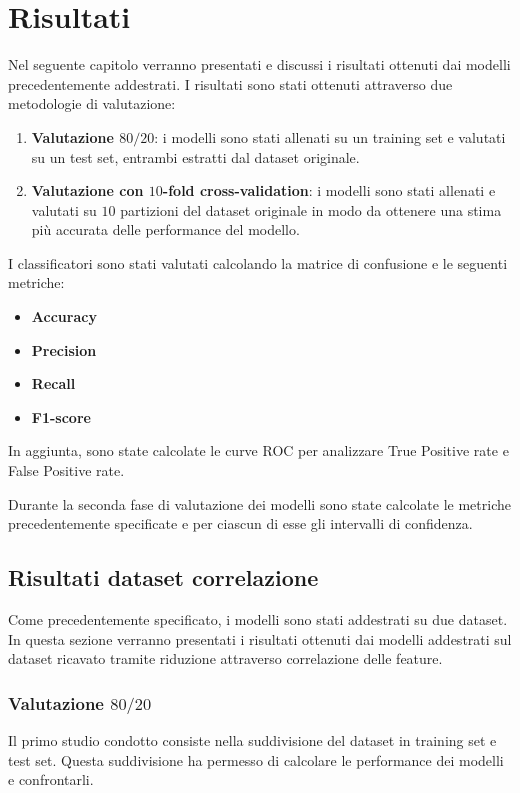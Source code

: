 \chapter{Risultati} \label{chp:risultati}
Nel seguente capitolo verranno presentati e discussi i risultati ottenuti dai
modelli precedentemente addestrati. I risultati sono stati ottenuti attraverso
due metodologie di valutazione:
\begin{enumerate}
    \item \textbf{Valutazione $80/20$}: i modelli sono stati allenati su un
          training set e valutati su un test set, entrambi estratti dal dataset
          originale.
    \item \textbf{Valutazione con $10$-fold cross-validation}: i modelli sono
          stati allenati e valutati su $10$ partizioni del dataset originale in
          modo da ottenere una stima più accurata delle performance del modello.
\end{enumerate}
I classificatori sono stati valutati calcolando la matrice di confusione e le
seguenti metriche:
\begin{itemize}
    \item \textbf{Accuracy}
    \item \textbf{Precision}
    \item \textbf{Recall}
    \item \textbf{F1-score}
\end{itemize}

In aggiunta, sono state calcolate le curve ROC per analizzare True Positive rate
e False Positive rate.

Durante la seconda fase di valutazione dei modelli sono state calcolate le
metriche precedentemente specificate e per ciascun di esse gli intervalli di
confidenza.
\section{Risultati dataset correlazione} \label{sec:risultati_corr}
Come precedentemente specificato, i modelli sono stati addestrati su due dataset.
In questa sezione verranno presentati i risultati ottenuti dai modelli addestrati
sul dataset ricavato tramite riduzione attraverso correlazione delle feature.
\subsection*{Valutazione $80/20$}
Il primo studio condotto consiste nella suddivisione del dataset in training
set e test set. Questa suddivisione ha permesso di calcolare le performance dei
modelli e confrontarli.


